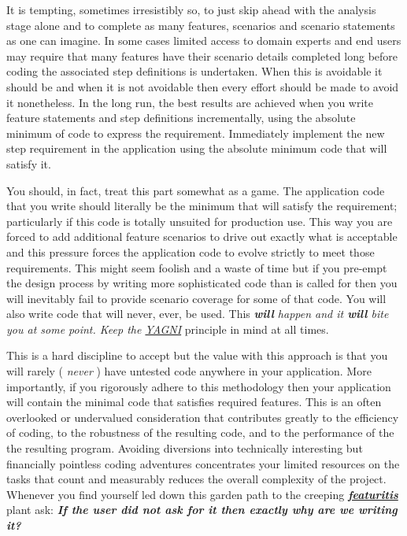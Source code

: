 \documentclass[10pt]{book}
\begin{document}
It is tempting, sometimes irresistibly so, to just skip ahead with the analysis stage alone and to complete as many features, scenarios and scenario statements as one can imagine.  In some cases limited access to domain experts and end users may require that many features have their scenario details completed long before coding the associated step definitions is undertaken. When this is avoidable it should be and when it is not avoidable then every effort should be made to avoid it nonetheless.  In the long run, the best results are achieved when you write feature statements and step definitions incrementally, using the absolute minimum of code to express the requirement. Immediately implement the new step requirement in the application using the absolute minimum code that will satisfy it.

You should, in fact, treat this part somewhat as a game.  The application code that you write should literally be the minimum that will satisfy the requirement; particularly if this code is totally unsuited for production use.  This way you are forced to add additional feature scenarios to drive out exactly what is acceptable and this pressure forces the application code to evolve strictly to meet those requirements.  This might seem foolish and a waste of time but if you pre-empt the design process by writing more sophisticated code than is called for then you will inevitably fail to provide scenario coverage for some of that code.  You will also write code that will never, ever, be used. This \emph{\textbf{will} happen and it \emph{\textbf{will}} bite you at some point. Keep the \href{http://en.wikipedia.org/wiki/You_ain\%27t_gonna_need_it}{YAGNI}} principle in mind at all times.

This is a hard discipline to accept but the value with this approach is that you will rarely ( \emph{never} ) have untested code anywhere in your application.  More importantly, if you rigorously adhere to this methodology then your application will contain the minimal code that satisfies required features.  This is an often overlooked or undervalued consideration that contributes greatly to the efficiency of coding, to the robustness of the resulting code, and to the performance of the the resulting program.  Avoiding diversions into technically interesting but financially pointless coding adventures concentrates your limited resources on the tasks that count and measurably reduces the overall complexity of the project.  Whenever you find yourself led down this garden path to the creeping \href{http://en.wikipedia.org/wiki/Feature_creep}{\textbf{\emph{featuritis}}} plant ask: \textbf{\emph{If the user did not ask for it then exactly why are we writing it?}}
\end{document}
